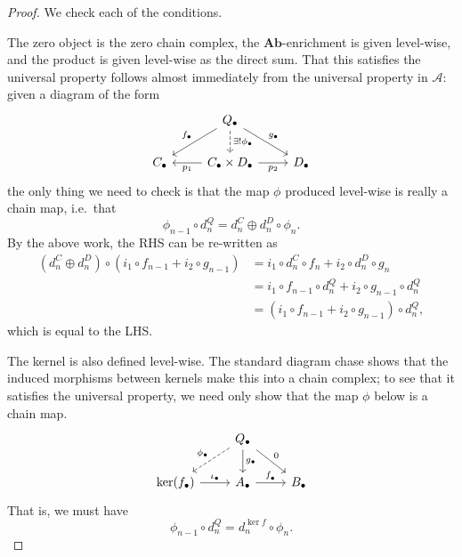 \documentclass[main.tex]{subfiles}
\begin{document}
\begin{proof}
  We check each of the conditions.

  The zero object is the zero chain complex, the $\mathbf{Ab}$-enrichment is given level-wise, and the product is given level-wise as the direct sum. That this satisfies the universal property follows almost immediately from the universal property in $\mathcal{A}$: given a diagram of the form
  \begin{equation*}
    \begin{tikzcd}
      & Q_{\bullet}
      \arrow[dr, "g_{\bullet}"]
      \arrow[dl, swap, "f_{\bullet}"]
      \arrow[d, dashed, "\exists!\phi_{\bullet}"]
      \\
      C_{\bullet}
      & C_{\bullet} \times D_{\bullet}
      \arrow[r, swap, "p_{2}"]
      \arrow[l, "p_{1}"]
      & D_{\bullet}
    \end{tikzcd}
  \end{equation*}
  the only thing we need to check is that the map $\phi$ produced level-wise is really a chain map, i.e.\ that
  \begin{equation*}
    \phi_{n-1} \circ d_{n}^{Q} = d_{n}^{C} \oplus d_{n}^{D} \circ \phi_{n}.
  \end{equation*}
  By the above work, the RHS can be re-written as
  \begin{align*}
    (d^{C}_{n} \oplus d^{D}_{n}) \circ (i_{1} \circ f_{n-1} + i_{2} \circ g_{n-1}) &= i_{1} \circ d_{n}^{C} \circ f_{n} + i_{2} \circ d_{n}^{D} \circ g_{n} \\
    &= i_{1} \circ f_{n-1} \circ d^{Q}_{n} + i_{2} \circ g_{n-1} \circ d^{Q}_{n} \\
    &= (i_{1} \circ f_{n-1} + i_{2} \circ g_{n-1}) \circ d^{Q}_{n},
  \end{align*}
  which is equal to the LHS.

  The kernel is also defined level-wise. The standard diagram chase shows that the induced morphisms between kernels make this into a chain complex; to see that it satisfies the universal property, we need only show that the map $\phi$ below is a chain map.
  \begin{equation*}
    \begin{tikzcd}
      & Q_{\bullet}
      \arrow[dr, "0"]
      \arrow[d, "g_{\bullet}"]
      \arrow[dl, swap, dashed, "\phi_{\bullet}"]
      \\
      \ker(f_{\bullet})
      \arrow[r, "\iota_{\bullet}"]
      & A_{\bullet}
      \arrow[r, "f_{_{\bullet}}"]
      & B_{\bullet}
    \end{tikzcd}
  \end{equation*}
  That is, we must have
  \begin{equation}
    \label{eq:needstocommute}
    \phi_{n-1} \circ d^{Q}_{n} = d_{n}^{\ker f} \circ \phi_{n}.
  \end{equation}


\end{proof}
\end{document}
